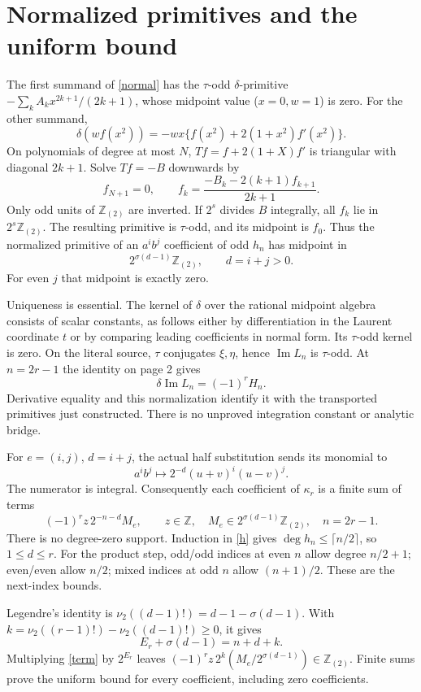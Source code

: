 \documentclass[11pt]{article}
\newcommand{\Z}{\mathbb Z}\newcommand{\Q}{\mathbb Q}
\newcommand{\loc}{\Z_{(2)}}\newcommand{\val}{\nu_2}
\newcommand{\sig}{\sigma}
\begin{document}
\newpage
\section{Normalized primitives and the uniform bound}
The first summand of \eqref{normal} has the $\tau$-odd $\delta$-primitive
$-\sum_k A_k x^{2k+1}/(2k+1)$, whose midpoint value ($x=0,w=1$) is zero. For the other summand,
\[
 \delta(wf(x^2))=-wx\{f(x^2)+2(1+x^2)f'(x^2)\}.
\]
On polynomials of degree at most $N$, $Tf=f+2(1+X)f'$ is triangular with diagonal $2k+1$. Solve $Tf=-B$ downwards by
\[
 f_{N+1}=0,\qquad f_k=\frac{-B_k-2(k+1)f_{k+1}}{2k+1}.
\]
Only odd units of $\loc$ are inverted. If $2^s$ divides $B$ integrally, all $f_k$ lie in $2^s\loc$. The resulting primitive is $\tau$-odd, and its midpoint is $f_0$. Thus the normalized primitive of an $a^ib^j$ coefficient of odd $h_n$ has midpoint in
\begin{equation}\label{primitive}2^{\sig(d-1)}\loc,\qquad d=i+j>0.\end{equation}
For even $j$ that midpoint is exactly zero.

Uniqueness is essential. The kernel of $\delta$ over the rational midpoint algebra consists of scalar constants, as follows either by differentiation in the Laurent coordinate $t$ or by comparing leading coefficients in normal form. Its $\tau$-odd kernel is zero. On the literal source, $\tau$ conjugates $\xi,\eta$, hence $\operatorname{Im}L_n$ is $\tau$-odd. At $n=2r-1$ the identity on page 2 gives
\[
 \delta\operatorname{Im}L_n=(-1)^r H_n.
\]
Derivative equality and this normalization identify it with the transported primitives just constructed. There is no unproved integration constant or analytic bridge.

For $e=(i,j)$, $d=i+j$, the actual half substitution sends its monomial to
\[
 a^ib^j\longmapsto 2^{-d}(u+v)^i(u-v)^j.
\]
The numerator is integral. Consequently each coefficient of $\kappa_r$ is a finite sum of terms
\begin{equation}\label{term}(-1)^r z\,2^{-n-d}M_e,\qquad z\in\Z,\quad
 M_e\in2^{\sig(d-1)}\loc,\quad n=2r-1.\end{equation}
There is no degree-zero support. Induction in \eqref{h} gives $\deg h_n\le\lceil n/2\rceil$, so $1\le d\le r$. For the product step, odd/odd indices at even $n$ allow degree $n/2+1$; even/even allow $n/2$; mixed indices at odd $n$ allow $(n+1)/2$. These are the next-index bounds.

Legendre's identity is $\val((d-1)!)=d-1-\sig(d-1)$. With $k=\val((r-1)!)-\val((d-1)!)\ge0$, it gives
\[
 E_r+\sig(d-1)=n+d+k.
\]
Multiplying \eqref{term} by $2^{E_r}$ leaves $(-1)^r z\,2^k(M_e/2^{\sig(d-1)})\in\loc$. Finite sums prove the uniform bound for every coefficient, including zero coefficients.
\end{document}
